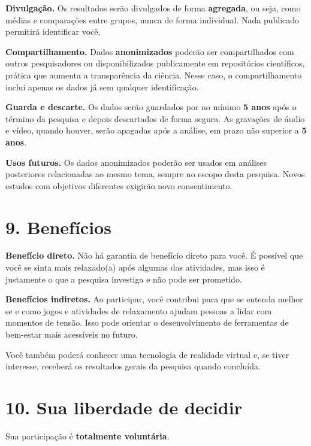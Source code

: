 \documentclass[12pt,a4paper]{article}
\begin{document}
\textbf{Divulgação.} Os resultados serão divulgados de forma \textbf{agregada},
ou seja, como médias e comparações entre grupos, nunca de forma individual. Nada
publicado permitirá identificar você.

\textbf{Compartilhamento.} Dados \textbf{anonimizados} poderão ser
compartilhados com outros pesquisadores ou disponibilizados publicamente em
repositórios científicos, prática que aumenta a transparência da ciência. Nesse
caso, o compartilhamento inclui apenas os dados já sem qualquer identificação.

\textbf{Guarda e descarte.} Os dados serão guardados por no mínimo
\textbf{5 anos} após o término da pesquisa e depois descartados de forma segura.
As gravações de áudio e vídeo, quando houver, serão apagadas após a análise, em
prazo não superior a \textbf{5 anos}.

\textbf{Usos futuros.} Os dados anonimizados poderão ser usados em análises
posteriores relacionadas ao mesmo tema, sempre no escopo desta pesquisa. Novos
estudos com objetivos diferentes exigirão novo consentimento.

\section*{9. Benefícios}

\textbf{Benefício direto.} Não há garantia de benefício direto para você. É
possível que você se sinta mais relaxado(a) após algumas das atividades, mas isso
é justamente o que a pesquisa investiga e não pode ser prometido.

\textbf{Benefícios indiretos.} Ao participar, você contribui para que se entenda
melhor se e como jogos e atividades de relaxamento ajudam pessoas a lidar com
momentos de tensão. Isso pode orientar o desenvolvimento de ferramentas de
bem-estar mais acessíveis no futuro.

Você também poderá conhecer uma tecnologia de realidade virtual e, se tiver
interesse, receberá os resultados gerais da pesquisa quando concluída.

\section*{10. Sua liberdade de decidir}

Sua participação é \textbf{totalmente voluntária}.
\end{document}
